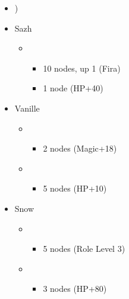 \begin{menu}
	\begin{itemize}
		\paradigm
		\begin{itemize}
			\item {}%
				  {\paradigmline[4]{\syn}{\med}{(\com})}%
			      {\paradigmline{\rav}{(\rav)}{\rav}}%
			      {\paradigmline{\syn}{\med}{\com}}%
			      {\paradigmline{\syn}{\sab}{\rav}}%
			      {\paradigmline{\com}{(\rav)}{\com}}%
			      {\paradigmline{(\rav)}{(\rav)}{(\com)}}
		\end{itemize}
		\crystarium
		\begin{itemize}
			\item Sazh
				\begin{itemize}
					\item \rav
				    	\begin{itemize}
					    	\item 10 nodes, up 1 (Fira)
							\item 1 node (HP+40)
				        \end{itemize}
			    \end{itemize}
			\item Vanille
				\begin{itemize}
					\item \med
				    	\begin{itemize}
					    	\item 2 nodes (Magic+18)
				        \end{itemize}
				    \item \rav
				    	\begin{itemize}
				    		\item 5 nodes (HP+10)
				    	\end{itemize}
			    \end{itemize}
			\item Snow
				\begin{itemize}
					\item \rav
						\begin{itemize}
							\item 5 nodes (Role Level 3)
						\end{itemize}
					\item \sen
						\begin{itemize}
							\item 3 nodes (HP+80)
						\end{itemize}
				\end{itemize}
		\end{itemize}

\end{itemize}
\end{menu}
